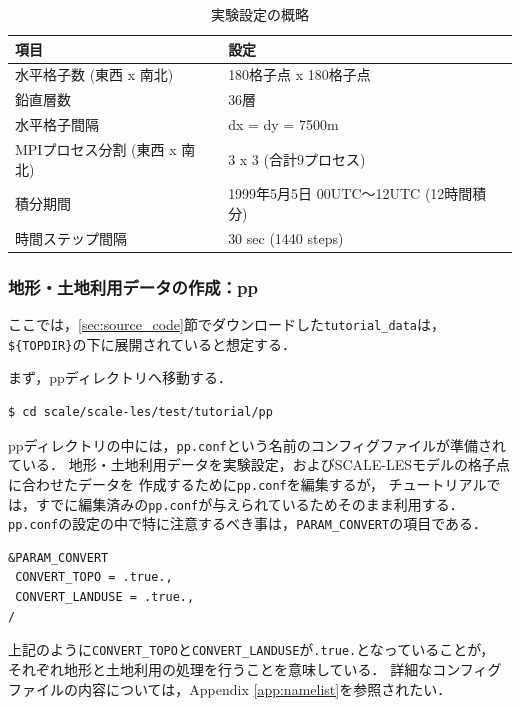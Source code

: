\begin{table}[t]
\begin{center}
  \caption{実験設定の概略}
  \label{tab:grids}
  \begin{tabularx}{150mm}{|l|X|} \hline
    \rowcolor[gray]{0.9} 項目 & 設定 \\ \hline
    水平格子数 (東西 x 南北) & 180格子点 x 180格子点 \\ \hline
    鉛直層数                 & 36層                  \\ \hline
    水平格子間隔             & dx = dy = 7500m       \\ \hline
    MPIプロセス分割 (東西 x 南北) & 3 x 3 (合計9プロセス) \\ \hline
    積分期間 & 1999年5月5日 00UTC～12UTC (12時間積分) \\ \hline
    時間ステップ間隔 & 30 sec (1440 steps) \\ \hline
  \end{tabularx}
\end{center}
\end{table}


\subsubsection{地形・土地利用データの作成：pp}

ここでは，\ref{sec:source_code}節でダウンロードした\verb|tutorial_data|は，
\verb|${TOPDIR}|の下に展開されていると想定する．

まず，ppディレクトリへ移動する．\\
\begin{verbatim}
$ cd scale/scale-les/test/tutorial/pp
\end{verbatim}

ppディレクトリの中には，\verb|pp.conf|という名前のコンフィグファイルが準備されている．
地形・土地利用データを実験設定，およびSCALE-LESモデルの格子点に合わせたデータを
作成するために\verb|pp.conf|を編集するが，
チュートリアルでは，すでに編集済みの\verb|pp.conf|が与えられているためそのまま利用する．
\verb|pp.conf|の設定の中で特に注意するべき事は，\verb|PARAM_CONVERT|の項目である．

\begin{verbatim}
&PARAM_CONVERT
 CONVERT_TOPO = .true.,
 CONVERT_LANDUSE = .true.,
/
\end{verbatim}

上記のように\verb|CONVERT_TOPO|と\verb|CONVERT_LANDUSE|が\verb|.true.|となっていることが，
それぞれ地形と土地利用の処理を行うことを意味している．
詳細なコンフィグファイルの内容については，Appendix \ref{app:namelist}を参照されたい．


